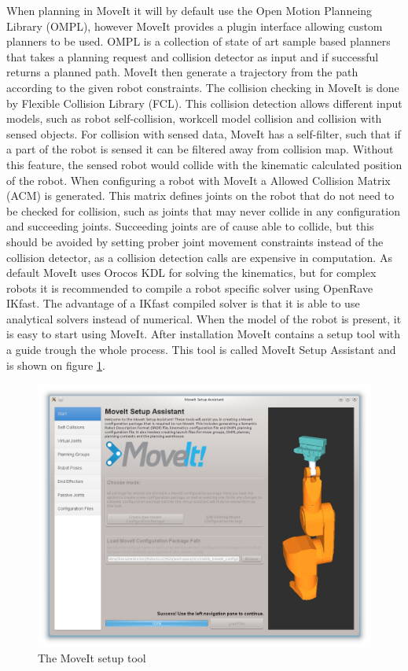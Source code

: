 When planning in MoveIt it will by default use the Open Motion Planneing Library (OMPL), however MoveIt provides a plugin interface allowing custom planners to be used. OMPL is a collection of state of art sample based planners that takes a planning request and collision detector as input and if successful returns a planned path. MoveIt then generate a trajectory from the path according to the given robot constraints. The collision checking in MoveIt is done by Flexible Collision Library (FCL). This collision detection allows different input models, such as robot self-collision, workcell model collision and collision with sensed objects. For collision with sensed data, MoveIt has a self-filter, such that if a part of the robot is sensed it can be filtered away from collision map. Without this feature, the sensed robot would collide with the kinematic calculated position of the robot. When configuring a robot with MoveIt a Allowed Collision Matrix (ACM) is generated. This matrix defines joints on the robot that do not need to be checked for collision, such as joints that may never collide in any configuration and succeeding joints. Succeeding joints are of cause able to collide, but this should be avoided by setting prober joint movement constraints instead of the collision detector, as a collision detection calls are expensive in computation. As default MoveIt uses Orocos KDL for solving the kinematics, but for complex robots it is recommended to compile a robot specific solver using OpenRave IKfast. The advantage of a IKfast compiled solver is that it is able to use analytical solvers instead of numerical.
When the model of the robot is present, it is easy to start using MoveIt. After installation MoveIt contains a setup tool with a guide trough the whole process. This tool is called MoveIt Setup Assistant and is shown on figure \ref{fig:moveit_setup_assistant}.

\begin{figure}[htb]
	\begin{center}
		\includegraphics[scale=0.4,trim=0 0 0 0]{graphics/05_robotics/moveit_setup_assistant.png}%
		\caption{The MoveIt setup tool}
		\label{fig:moveit_setup_assistant}
	\end{center}
\end{figure}

